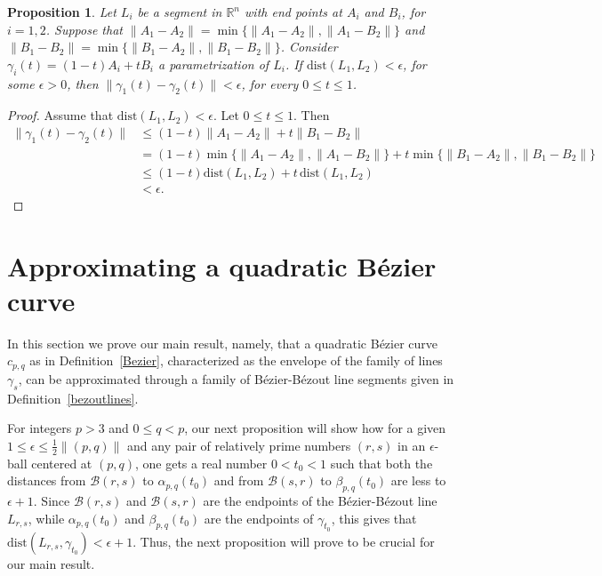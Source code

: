 \documentclass[12pt,english]{article}
\newcommand{\R}{\mathbb R}
\newcommand{\B}{\mathcal B}
\newtheorem{proposition}[theorem]{Proposition}
\begin{document}
\begin{proposition}\label{points}
   Let $L_i$ be a segment in $\R^n$ with end points at $A_i$ and $B_i$, for $i=1,2$. Suppose that $\|A_1-A_2\|=\min\{ \|A_1-A_2\|, \|A_1-B_2\|\}$ and $\|B_1-B_2\|=\min\{ \|B_1-A_2\|,\|B_1-B_2\|\}$. Consider $\gamma_i(t)=(1-t)A_i+tB_i$  a parametrization of $L_i$. If  $\mathrm{dist}(L_1,L_2)<\epsilon$, for some $\epsilon>0$, then $\|\gamma_1(t)-\gamma_2(t)\|<\epsilon$, for every $0\leq t\leq 1$.
\end{proposition}
\begin{proof}
   Assume that $\mathrm{dist}(L_1,L_2)<\epsilon$. Let $0\leq t\leq 1$. Then
   \begin{align*}
    \|\gamma_1(t)-\gamma_2(t)\|&\leq
    (1-t)\|A_1-A_2\|+t\|B_1-B_2\|\\
    &=(1-t)\min\{ \|A_1-A_2\|, \|A_1-B_2\|\} +
      t\min\{ \|B_1-A_2\|,\|B_1-B_2\|\}\\
      &\leq (1-t)\mathrm{dist}(L_1,L_2)
           +t\, \mathrm{dist}(L_1,L_2)\\
      &<\epsilon.
  \end{align*}
\end{proof}






\section{Approximating a quadratic B\'ezier curve}

In this section we prove our main result, namely, that a quadratic B\'ezier curve $c_{p,q}$ as in Definition~\ref{Bezier}, characterized as the envelope of the family of lines $\gamma_{s}$, can be approximated through a family of  B\'ezier-B\'ezout line segments given
in Definition~\ref{bezoutlines}.






For integers $p>3$ and $0\leq q <p$, our next proposition will show how for a given $1\leq\epsilon\leq\frac{1}{2}\|(p,q)\|$ and any pair of relatively prime numbers $(r,s)$ in an $\epsilon$-ball centered at $(p,q)$,  one gets a real number $0< t_0< 1$ such that both the distances from $\B(r,s)$  to $\alpha_{p,q}(t_0)$ and  from $\B(s,r)$ to $\beta_{p,q}(t_0)$ are less to $\epsilon +1$. Since $\B(r,s)$ and $\B(s,r)$ are the endpoints of the B\'ezier-B\'ezout line $L_{r,s}$, while $\alpha_{p,q}(t_0)$ and $\beta_{p,q}(t_0)$ are the endpoints of $\gamma_{t_0}$, this gives that  $\mathrm{dist}(L_{r,s},\gamma_{t_0})<\epsilon+1$.  Thus, the next proposition will prove to  be crucial for our main result.
\end{document}
